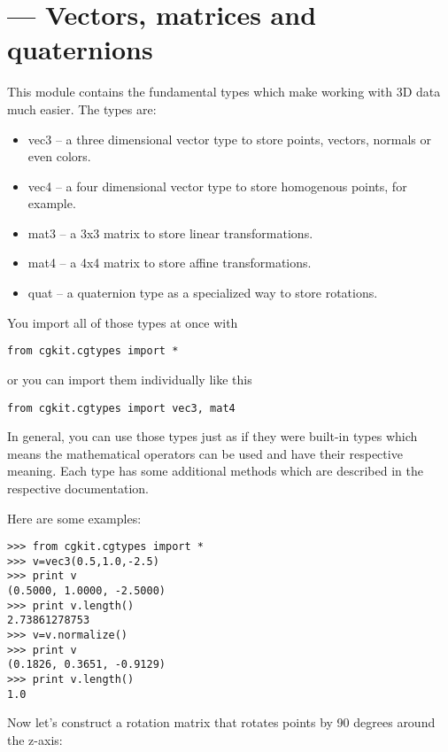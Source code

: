 \section{ ---
         Vectors, matrices and quaternions}


This module contains the fundamental types which make working with 3D
data much easier. The types are:

\begin{itemize}
\item vec3 -- a three dimensional vector type to store points, vectors, normals or even colors.
\item vec4 -- a four dimensional vector type to store homogenous points, for example.
\item mat3 -- a 3x3 matrix to store linear transformations.
\item mat4 -- a 4x4 matrix to store affine transformations.
\item quat -- a quaternion type as a specialized way to store rotations.
\end{itemize}

You import all of those types at once with

\begin{verbatim}
from cgkit.cgtypes import *
\end{verbatim}

or you can import them individually like this

\begin{verbatim}
from cgkit.cgtypes import vec3, mat4
\end{verbatim}

In general, you can use those types just as if they were built-in
types which means the mathematical operators can be used and have
their respective meaning. Each type has some additional methods which
are described in the respective documentation.

Here are some examples:

\begin{verbatim}
>>> from cgkit.cgtypes import *
>>> v=vec3(0.5,1.0,-2.5)
>>> print v
(0.5000, 1.0000, -2.5000)
>>> print v.length()
2.73861278753
>>> v=v.normalize()
>>> print v
(0.1826, 0.3651, -0.9129)
>>> print v.length()
1.0
\end{verbatim}

Now let's construct a rotation matrix that rotates points by 90
degrees around the z-axis:

